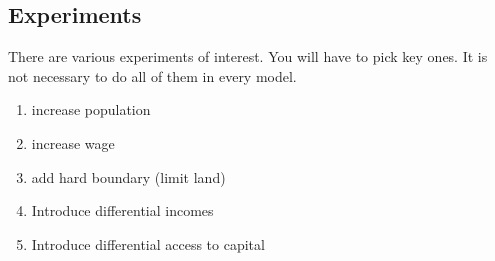 \subsection{Experiments}
There are various experiments of interest. You will have to pick key ones. It is not necessary to do all of them in every model. 

	\begin{enumerate}
		\item increase population
		\item increase wage
		\item add hard boundary (limit land)
		\item Introduce differential incomes
		\item Introduce differential access to capital
	\end{enumerate}



